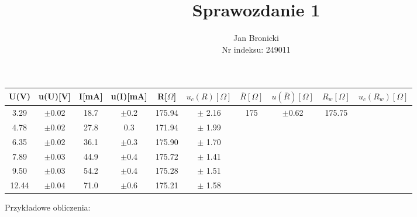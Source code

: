 \documentclass{article}
\title{Sprawozdanie 1}
\author{Jan Bronicki \\
Nr indeksu: 249011}
\date{}
\begin{document}
\maketitle



\begin{center}
    \renewcommand{\arraystretch}{1.3}
\begin{tabular}{ |c|c|c|c|c|c|c|c|c|c| }
    \hline
    U(V)&u(U)[V]&I[mA]&u(I)[mA]&R[$\Omega$]&$u_c(R)[\Omega]$&$\bar{R}[\Omega]$&$u(\bar{R})[\Omega]$&$R_w[\Omega]$&$u_c(R_w)[\Omega]$ \\
    \hline \hline
    3.29&$\pm$0.02&18.7&$\pm$0.2&175.94&$\pm$ 2.16& \multirow{6}{*}{175}&\multirow{6}{*}{$\pm$0.62}&\multirow{6}{*}{175.75}&\\ 
    \cline{1-6}

    4.78&$\pm$0.02&27.8&0.3&171.94&$\pm$ 1.99&&&&\\ 
    \cline{1-6}
  
    6.35&$\pm$0.02&36.1&$\pm$0.3&175.90&$\pm$ 1.70&&&&\\ 
    \cline{1-6}

    7.89&$\pm$0.03&44.9&$\pm$0.4&175.72&$\pm$ 1.41&&&&\\ 
    \cline{1-6}

    9.50&$\pm$0.03&54.2&$\pm$0.4&175.28&$\pm$ 1.51&&&&\\ 
    \cline{1-6}
    
    12.44&$\pm$0.04&71.0&$\pm$0.6&175.21&$\pm$ 1.58&&&&\\ 
    \hline
\end{tabular}
\end{center}
Przykładowe obliczenia:
\end{document}
